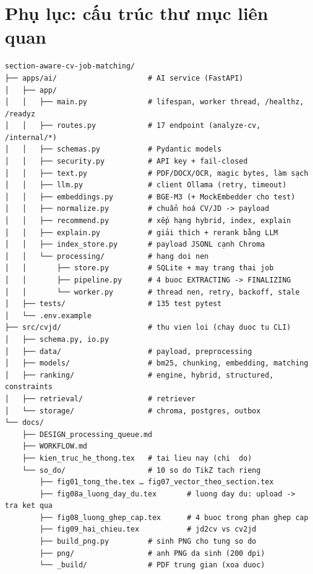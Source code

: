 \documentclass[a4paper,11pt]{article}
\begin{document}
\section*{Phụ lục: cấu trúc thư mục liên quan}

\begin{verbatim}
section-aware-cv-job-matching/
├── apps/ai/                     # AI service (FastAPI)
│   ├── app/
│   │   ├── main.py              # lifespan, worker thread, /healthz, /readyz
│   │   ├── routes.py            # 17 endpoint (analyze-cv, /internal/*)
│   │   ├── schemas.py           # Pydantic models
│   │   ├── security.py          # API key + fail-closed
│   │   ├── text.py              # PDF/DOCX/OCR, magic bytes, làm sạch
│   │   ├── llm.py               # client Ollama (retry, timeout)
│   │   ├── embeddings.py        # BGE-M3 (+ MockEmbedder cho test)
│   │   ├── normalize.py         # chuẩn hoá CV/JD -> payload
│   │   ├── recommend.py         # xếp hạng hybrid, index, explain
│   │   ├── explain.py           # giải thích + rerank bằng LLM
│   │   ├── index_store.py       # payload JSONL cạnh Chroma
│   │   └── processing/          # hang doi nen
│   │       ├── store.py         # SQLite + may trang thai job
│   │       ├── pipeline.py      # 4 buoc EXTRACTING -> FINALIZING
│   │       └── worker.py        # thread nen, retry, backoff, stale
│   ├── tests/                   # 135 test pytest
│   └── .env.example
├── src/cvjd/                    # thu vien loi (chay duoc tu CLI)
│   ├── schema.py, io.py
│   ├── data/                    # payload, preprocessing
│   ├── models/                  # bm25, chunking, embedding, matching
│   ├── ranking/                 # engine, hybrid, structured, constraints
│   ├── retrieval/               # retriever
│   └── storage/                 # chroma, postgres, outbox
└── docs/
    ├── DESIGN_processing_queue.md
    ├── WORKFLOW.md
    ├── kien_truc_he_thong.tex   # tai lieu nay (chi  do)
    └── so_do/                   # 10 so do TikZ tach rieng
        ├── fig01_tong_the.tex … fig07_vector_theo_section.tex
        ├── fig08a_luong_day_du.tex       # luong day du: upload -> tra ket qua
        ├── fig08_luong_ghep_cap.tex      # 4 buoc trong phan ghep cap
        ├── fig09_hai_chieu.tex           # jd2cv vs cv2jd
        ├── build_png.py         # sinh PNG cho tung so do
        ├── png/                 # anh PNG da sinh (200 dpi)
        └── _build/              # PDF trung gian (xoa duoc)
\end{verbatim}
\end{document}
